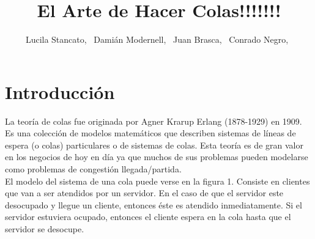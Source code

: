 \documentclass[10pt,journal,compsoc]{IEEEtran}
\begin{document}
\title{El Arte de Hacer Colas!!!!!!!}


\author{Lucila Stancato,~
		Dami\'an Modernell,~
		Juan Brasca,~
		Conrado Negro,~%
}


\maketitle

\IEEEdisplaynotcompsoctitleabstractindextext

\IEEEpeerreviewmaketitle

\section{Introducci\'on} %
La teor\'ia de colas fue originada por Agner Krarup Erlang (1878-1929) en 1909. Es una colecci\'on
de modelos matem\'aticos que describen sistemas de l\'ineas de espera (o colas) particulares o de
sistemas de colas. Esta teor\'ia es de gran valor en los negocios de hoy en d\'ia ya que muchos de
sus problemas pueden modelarse como problemas de congesti\'on llegada/partida.\\
El modelo del sistema de una cola puede verse en la figura 1. Consiste en clientes que van a ser
atendidos por un servidor. En el caso de que el servidor este desocupado y llegue un cliente, entonces
\'este es atendido inmediatamente. Si el servidor estuviera ocupado, entonces el cliente espera en la
cola hasta que el servidor se desocupe.\\
\end{document}
